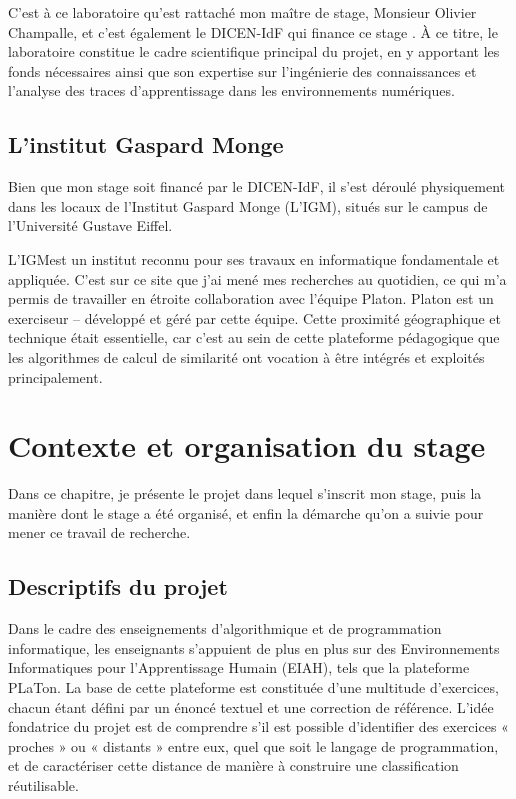 \documentclass[12pt,a4paper,oneside]{report}
\begin{document}
C'est à ce laboratoire qu'est rattaché mon maître de stage, Monsieur Olivier
 Champalle, et c'est également le DICEN-IdF qui finance ce stage . À ce titre, le laboratoire constitue le cadre scientifique principal du
  projet, en y apportant les fonds nécessaires ainsi que son expertise sur
   l'ingénierie des connaissances et l'analyse des traces d'apprentissage dans 
   les environnements numériques.

\section{L'institut Gaspard Monge }

Bien que mon stage soit financé par le DICEN-IdF, il s'est déroulé physiquement
 dans les locaux de l'Institut Gaspard Monge (L'IGM), situés sur le campus de 
 l'Université Gustave Eiffel. 

L'IGMest un institut reconnu pour ses travaux en informatique fondamentale et appliquée. C'est sur ce site que
 j'ai mené mes recherches au quotidien, ce qui m'a permis de travailler en
  étroite collaboration avec l'équipe Platon. Platon est  un exerciseur
   -- développé et géré par cette équipe. Cette proximité 
  géographique et technique était essentielle, car c'est au sein de cette
   plateforme pédagogique que les algorithmes de calcul de similarité ont vocation à être intégrés et 
   exploités principalement.



\chapter{ Contexte et organisation du stage }

Dans ce chapitre, je présente le projet dans lequel s'inscrit mon stage,
puis la manière dont le stage a été organisé, et enfin la
démarche qu'on a  suivie pour mener ce travail de recherche.


\section{Descriptifs du projet}


Dans le cadre des enseignements d'algorithmique et de programmation
informatique, les enseignants s'appuient de plus en plus sur des
Environnements Informatiques pour l'Apprentissage Humain (EIAH), tels que
la plateforme PLaTon. La base de cette plateforme est constituée d'une
multitude d'exercices, chacun étant défini par un énoncé textuel et une
correction de référence. L'idée fondatrice du projet est de comprendre s'il
est possible d'identifier des exercices « proches » ou « distants » entre
eux, quel que soit le langage de programmation, et de caractériser cette
distance de manière à construire une classification réutilisable.
\end{document}
